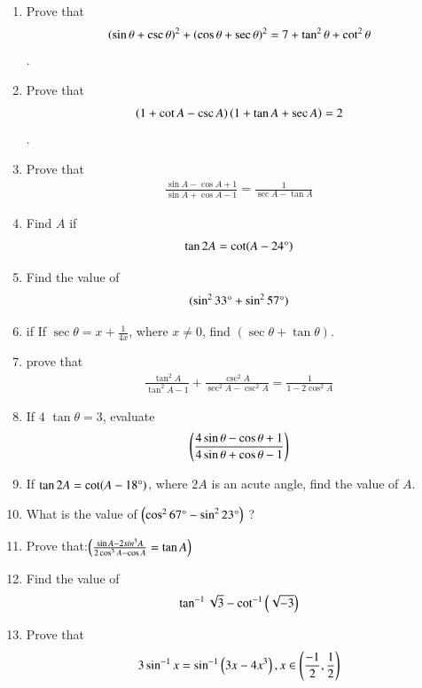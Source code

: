 \begin{enumerate}
  \hfill{}\item Prove that \begin{align*} \left(\sin\theta + \csc\theta\right)^2 + \left(\cos\theta + \sec\theta\right)^2 = 7 + \tan^2\theta + \cot^2\theta\end{align*}.
  \hfill{}\item Prove that \begin{align*}\left(1+\cot A - \csc A\right) \left(1 + \tan A +\sec A\right) = 2 \end{align*}.
  \hfill{}\item Prove that \begin{align*} \frac{\sin A-\cos A+1}{\sin A+ \cos A-1} =\frac{1}{\sec A-\tan A}\end{align*}
  \hfill{}\item Find $A$ if \begin{align*}\tan 2A = \cot (A-24\degree)\end{align*}
  \hfill{}\item Find the value of \begin{align*}(\sin^2 33\degree+ \sin^2 57\degree)\end{align*}
  
  
  \hfill{}\item if If $\sec\theta = x + \frac{1}{4x}$, where $x \neq 0$, find $(\sec\theta + \tan\theta)$.
  \hfill{}\item prove that \begin{align*} \frac{\tan^2A}{\tan^2 A-1}+\frac{\csc^2 A}{\sec^2 A-\csc^2 A}=\frac{1}{1-2\cos^2 A}\end{align*}
\hfill{}
\item If $4$ $\tan\theta=3$, evaluate \begin{align*}\left(\frac{4 \sin\theta - \cos\theta + 1 }{ 4 \sin\theta + \cos\theta - 1 } \right) \end{align*}   

\hfill{}\item If $\tan2A = \cot(A-18\degree)$, where $2A$ is an acute angle, find the value of $A$.

\hfill{}\item What is the value of $ \left(\cos^2 67\degree - \sin^2 23\degree\right)$ ?

\hfill{}\item  Prove that:$\left(\frac{\sin A - 2sin^3 A}{2 \cos^3 A-\cos A} = \tan A \right)$

			\hfill{}
\item Find the value of
	\begin{align*}
		\tan^{-1}\sqrt{3}-\cot^{-1}\left(\sqrt{-3}\right)
	\end{align*}
 \hfill{}\item Prove that 
			\begin{align*}
		3\sin^{-1}x=\sin^{-1}\left(3x-4x^3\right), x\in\left(\frac{-1}{2},\frac{1}{2}\right)
			\end{align*} 


\end{enumerate}
